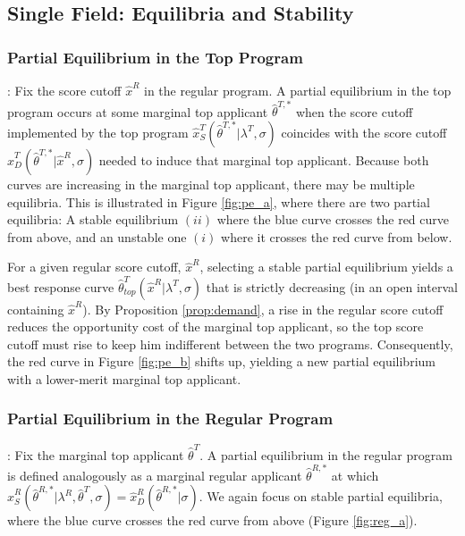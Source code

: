 \documentclass[12pt,reqno]{amsart}
\theoremstyle{definition}
\theoremstyle{plain} %
\begin{document}
\subsection{Single Field: Equilibria and Stability}



\subsubsection{Partial Equilibrium in the Top Program}: Fix the score cutoff $\hat{x}^R$ in the regular program. A partial equilibrium in the top program occurs at some marginal top applicant $\hat{\theta}^{T,*}$ when the score cutoff implemented by the top program $\hat{x}^T_S(\hat{\theta}^{T,*}|\lambda^T, \sigma)$ coincides with the score cutoff $\hat{x}^T_D(\hat{\theta}^{T,*}|\hat{x}^R,\sigma)$ needed to induce that marginal top applicant. Because both curves are increasing in the marginal top applicant, there may be multiple equilibria. This is illustrated in Figure \ref{fig:pe_a}, where there are two partial equilibria: A stable equilibrium $(ii)$ where the blue curve crosses the red curve from above, and an unstable one $(i)$ where it crosses the red curve from below.

\noindent For a given regular score cutoff, $\hat{x}^R$, selecting a stable partial equilibrium yields a best response curve $\hat{\theta}^T_{top}(\hat{x}^R|\lambda^T,\sigma)$ that is strictly decreasing (in an open interval containing $\hat{x}^R$). By Proposition \ref{prop:demand}, a rise in the regular score cutoff reduces the opportunity cost of the marginal top applicant, so the top score cutoff must rise to keep him indifferent between the two programs. Consequently, the red curve in Figure \ref{fig:pe_b} shifts up, yielding a new partial equilibrium with a lower-merit marginal top applicant.



\subsubsection{Partial Equilibrium in the Regular Program}: Fix the marginal top applicant $\hat{\theta}^T$. A partial equilibrium in the regular program is defined analogously as a marginal regular applicant $\hat{\theta}^{R,*}$ at which $\hat{x}^R_S(\hat{\theta}^{R,*}|\lambda^R,\hat{\theta}^T,\sigma) =\hat{x}^R_D(\hat{\theta}^{R,*}|\sigma)$. We again focus on stable partial equilibria, where the blue curve crosses the red curve from above (Figure \ref{fig:reg_a}).
\end{document}
